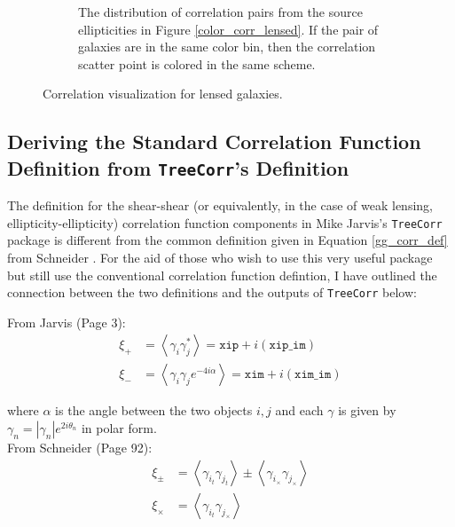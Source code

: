 \documentclass[%
 reprint,
 amsmath,amssymb,
 aps,nofootinbib
]{revtex4-1}
\begin{document}
\begin{figure}
\begin{subfigure}{0.44\textwidth}
        \captionsetup{justification=raggedright,singlelinecheck=false}
        \caption{The distribution of correlation pairs from the source ellipticities in Figure \ref{color_corr_lensed}. If the pair of galaxies are in the same color bin, then the correlation scatter point is colored in the same scheme.}
        \label{corr_dist_lensed}
    \end{subfigure}
    \vspace{-.05in}
    \caption{Correlation visualization for lensed galaxies.}
    \label{colored_corr_lensed}
\end{figure}



\newpage

\subsection{Deriving the Standard Correlation Function Definition from \texttt{TreeCorr}'s Definition}

The definition for the shear-shear (or equivalently, in the case of weak lensing, ellipticity-ellipticity) correlation function components in Mike Jarvis's \texttt{TreeCorr} package is different from the common definition given in Equation \eqref{gg_corr_def} from Schneider \cite{schneider}. For the aid of those who wish to use this very useful package but still use the conventional correlation function defintion, I have outlined the connection between the two definitions and the outputs of \texttt{TreeCorr} below:

\setlength\parindent{0pt}

\vspace{0.25 in}

From Jarvis \cite{jarvis} (Page 3):
\begin{align}
\xi_+&=\left<\gamma_i\gamma_j^*\right>=\texttt{xip}+i(\texttt{xip\_im})\label{s+}\\
\xi_-&=\left<\gamma_i\gamma_je^{-4i\alpha}\right>=\texttt{xim}+i(\texttt{xim\_im})\label{s-}
\end{align}

where $\alpha$ is the angle between the two objects $i,j$ and each $\gamma$ is given by $\gamma_n=|\gamma_n|e^{2i\theta_n}$ in polar form.\\

From Schneider \cite{schneider} (Page 92):
\begin{align}
\xi_\pm&=\left<\gamma_{i_t}\gamma_{j_t}\right>\pm\left<\gamma_{i_\times}\gamma_{j_\times}\right>\label{s+-}\\
\xi_\times&=\left<\gamma_{i_t}\gamma_{j_\times}\right>\label{sx}
\end{align}
\end{document}
